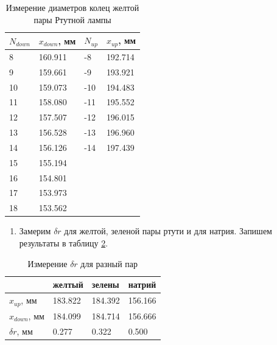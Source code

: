 \documentclass[a4paper,12pt]{article}
\begin{document}
\FloatBarrier
\begin{table}[!ht]
    \centering
    \caption{Измерение диаметров колец желтой пары Ртутной лампы}
    \begin{tabular}{|l|l|l|l|}
        \hline
        $N_{down}$ & $x_{down}$, мм & $N_{up}$ & $x_{up}$, мм   \\ \hline
        8       & 160.911 & -8    & 192.714 \\ \hline
        9       & 159.661 & -9    & 193.921 \\ \hline
        10      & 159.073 & -10   & 194.483 \\ \hline
        11      & 158.080 & -11   & 195.552 \\ \hline
        12      & 157.507 & -12   & 196.015 \\ \hline
        13      & 156.528 & -13   & 196.960 \\ \hline
        14      & 156.126 & -14   & 197.439 \\ \hline
        15      & 155.194 &       &         \\ \hline
        16      & 154.801 &       &         \\ \hline
        17      & 153.973 &       &         \\ \hline
        18      & 153.562 &       &         \\ \hline
    \end{tabular}
    \label{table:4}
\end{table}
\FloatBarrier

\clearpage

\begin{enumerate}[resume]
    \item Замерим $\delta r$ для желтой, зеленой пары ртути и для натрия. Запишем результаты в таблицу \ref{table:5}.
\end{enumerate}

\FloatBarrier
\begin{table}[!ht]
    \centering
    \caption{Измерение $\delta r$ для разный пар}
    \begin{tabular}{|l|l|l|l|}
        \hline
        ~              & желтый  & зелены  & натрий  \\ \hline
        $x_{up}$, мм   & 183.822 & 184.392 & 156.166 \\ \hline
        $x_{down}$, мм & 184.099 & 184.714 & 156.666 \\ \hline
        $\delta r$, мм & 0.277   & 0.322   & 0.500   \\ \hline
    \end{tabular}
    \label{table:5}
\end{table}
\FloatBarrier
\end{document}
